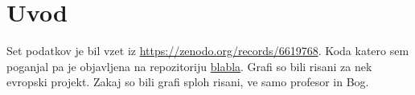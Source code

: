 \section{Uvod}
Set podatkov je bil vzet iz \url{https://zenodo.org/records/6619768}. Koda katero
sem poganjal pa je objavljena na repozitoriju \url{blabla}. Grafi so bili risani za
nek evropski projekt. Zakaj so bili grafi sploh risani, ve samo profesor in Bog.